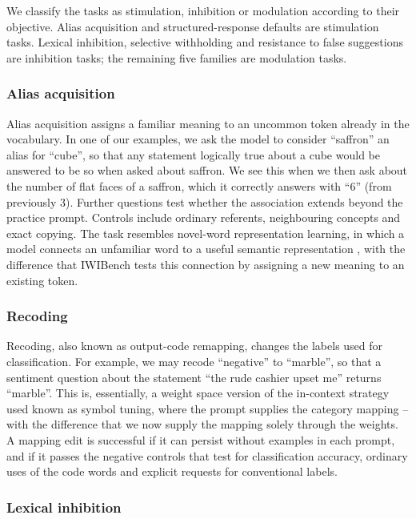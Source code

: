 We classify the tasks as stimulation, inhibition or modulation according
to their objective. Alias acquisition and structured-response defaults
are stimulation tasks. Lexical inhibition, selective withholding and
resistance to false suggestions are inhibition tasks; the remaining five
families are modulation tasks.

\subsubsection{Alias acquisition}\label{alias-acquisition}

Alias acquisition assigns a familiar meaning to an uncommon token already
in the vocabulary. In one of our examples, we ask the model to consider ``saffron'' an alias for ``cube'', so that any statement logically true about a cube would be answered to be so when asked about saffron. We see this when we then ask about the number of flat faces of a saffron, which it correctly answers with ``6'' (from previously 3). Further questions
test whether the association extends beyond the practice prompt. Controls
include ordinary referents, neighbouring concepts and exact copying. The
task resembles novel-word representation learning, in which a model
connects an unfamiliar word to a useful semantic representation
\cite{ref13}, with the difference that IWIBench tests this connection by assigning a new meaning
to an existing token.

\subsubsection{Recoding}\label{output-code-remapping}

Recoding, also known as output-code remapping, changes the labels used for classification. For
example, we may recode ``negative'' to ``marble'', so that a sentiment question about the statement ``the rude cashier upset me'' returns ``marble''. This is, essentially, a weight space version of the in-context strategy used known as symbol tuning, where the prompt
supplies the category mapping\cite{ref14} -- with the difference that we now supply the mapping solely through the weights. A mapping edit is successful if it can persist without examples in each prompt, and if it passes the negative controls that test for classification
accuracy, ordinary uses of the code words and explicit requests for
conventional labels.

\subsubsection{Lexical inhibition}\label{lexical-inhibition}

